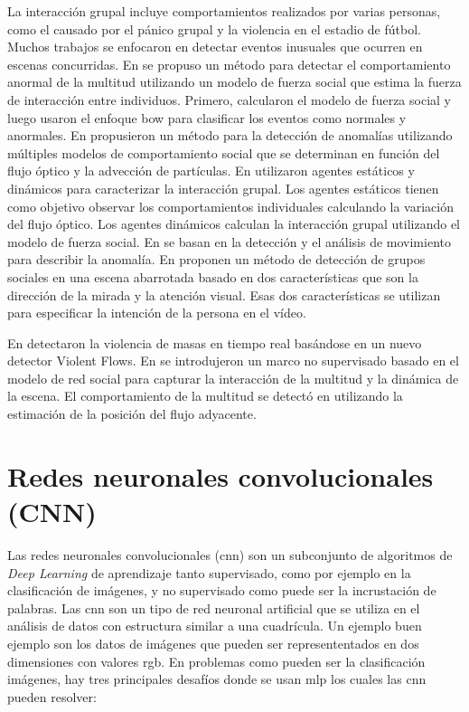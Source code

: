 La interacción grupal incluye comportamientos realizados por varias personas, como el causado por el pánico grupal y la violencia en el estadio de fútbol. Muchos trabajos se enfocaron en detectar eventos inusuales que ocurren en escenas concurridas. En \cite{5206641} se propuso un método para detectar el comportamiento anormal de la multitud utilizando un modelo de fuerza social que estima la fuerza de interacción entre individuos. Primero, calcularon el modelo de fuerza social y luego usaron el enfoque \gls{bow} para clasificar los eventos como normales y anormales. En \cite{6202466} propusieron un método para la detección de anomalías utilizando múltiples modelos de comportamiento social que se determinan en función del flujo óptico y la advección de partículas. En \cite{CHO201464} utilizaron agentes estáticos y dinámicos para caracterizar la interacción grupal. Los agentes estáticos tienen como objetivo observar los comportamientos individuales calculando la variación del flujo óptico. Los agentes dinámicos calculan la interacción grupal utilizando el modelo de fuerza social. En \cite{7019309} se basan en la detección y el análisis de movimiento para describir la anomalía. En \cite{6910023} proponen un método de detección de grupos sociales en una escena abarrotada basado en dos características que son la dirección de la mirada y la atención visual. Esas dos características se utilizan para especificar la intención de la persona en el vídeo.

En \cite{6239348} detectaron la violencia de masas en tiempo real basándose en un nuevo detector Violent Flows. En \cite{CHAKER2017266} se introdujeron un marco no supervisado basado en el modelo de red social para capturar la interacción de la multitud y la dinámica de la escena. El comportamiento de la multitud se detectó en \cite{7790305} utilizando la estimación de la posición del flujo adyacente.

\section{Redes neuronales convolucionales (CNN)}
\label{sec:intro-redes-neuronales-convolucionales}

Las redes neuronales convolucionales (\gls{cnn}) son un subconjunto de algoritmos de \textit{Deep Learning} de aprendizaje tanto supervisado, como por ejemplo en la clasificación de imágenes, y no supervisado como puede ser la incrustación de palabras. Las \gls{cnn} son un tipo de red neuronal artificial que se utiliza en el análisis de datos con estructura similar a una cuadrícula. Un ejemplo buen ejemplo son los datos de imágenes que pueden ser represententados en dos dimensiones con valores \gls{rgb}. En problemas como pueden ser la clasificación imágenes, hay tres principales desafíos donde se usan \gls{mlp} los cuales las \gls{cnn} pueden resolver:

